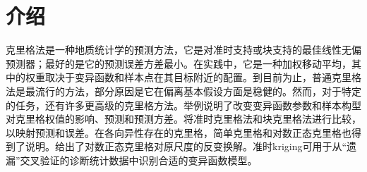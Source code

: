 \section{介绍}
克里格法是一种地质统计学的预测方法，它是对准时支持或块支持的最佳线性无偏预测器；最好的是它的预测误差方差最小。在实践中，它是一种加权移动平均，其中的权重取决于变异函数和样本点在其目标附近的配置。到目前为止，普通克里格法是最流行的方法，部分原因是它在偏离基本假设方面是稳健的。然而，对于特定的任务，还有许多更高级的克里格方法。举例说明了改变变异函数参数和样本构型对克里格权值的影响、预测和预测方差。将准时克里格法和块克里格法进行比较，以映射预测和误差。在各向异性存在的克里格，简单克里格和对数正态克里格也得到了说明。给出了对数正态克里格对原尺度的反变换解。准时kriging可用于从“遗漏”交叉验证的诊断统计数据中识别合适的变异函数模型。